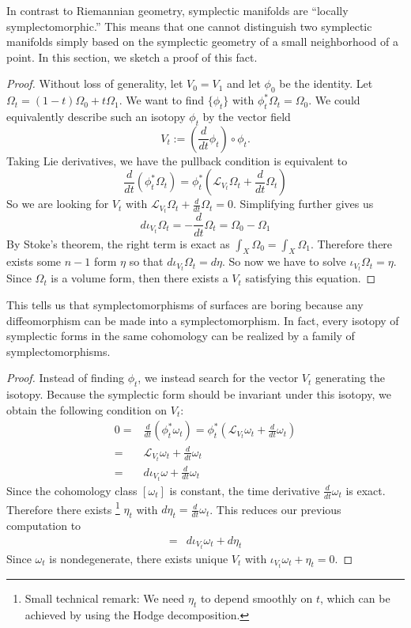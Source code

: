 
In contrast to Riemannian geometry,  symplectic manifolds are ``locally symplectomorphic.''
This means that one cannot distinguish two symplectic manifolds simply based on the symplectic geometry of a small neighborhood of a point. 
In this section, we sketch a proof of this fact.


\begin{proof}
    Without loss of generality,  let $V_0=V_1$ and let $\phi_0$ be the identity. 
    Let $\Omega_t=(1-t)\Omega_0+t\Omega_1$. 
    We want to find $\{\phi_t\}$ with $\phi_t^*\Omega_t=\Omega_0$. 
    We could equivalently describe such an isotopy $\phi_t$ by the vector field
    \[V_t:=\left(\frac{d}{dt}\phi_t\right)\circ\phi_t.\]
    Taking Lie derivatives,  we have the pullback condition is equivalent to  
    \[\frac{d}{dt}(\phi_t^*\Omega_t)=\phi_t^*\left(\mathcal L_{V_t} \Omega_t+\frac{d}{dt}\Omega_t\right)\]
    So we are looking for $V_t$ with $\mathcal L_{V_t}\Omega_t+\frac{d}{dt}\Omega_t=0$.
    Simplifying further gives us 
    \[
        d\iota_{V_t}\Omega_t=-\frac{d}{dt}\Omega_t=\Omega_0-\Omega_1\]
        By Stoke's theorem, the right term is exact as $\int_X\Omega_0=\int_X \Omega_1$. Therefore there exists some $n-1$ form $\eta$ so that
        $d\iota_{V_t}\Omega_t=d\eta$.
    So now we have to solve $\iota_{V_t}\Omega_t=\eta$. 
    Since $\Omega_t$ is a volume form,  then there exists a $V_t$ satisfying this equation. 
\end{proof}
This tells us that symplectomorphisms of surfaces are boring because any diffeomorphism can be made into a symplectomorphism. 
In fact, every isotopy of symplectic forms in the same cohomology can be realized by a family of symplectomorphisms. 

\begin{proof}
    Instead of finding $\phi_t$, we instead search for the vector $V_t$ generating the isotopy.
    Because the symplectic form should be invariant under this isotopy, we obtain the following condition on $V_t$:
    \begin{align*}  0=&\frac{d}{dt}(\phi_t^*\omega_t)=\phi_t^*\left(\mathcal L_{V_t}\omega_t+\frac{d}{dt}\omega_t\right)\\
        =&\mathcal L_{V_t}\omega_t + \frac{d}{dt}\omega_t\\
        =&d\iota_{V_t}\omega+\frac{d}{dt}\omega_t
    \end{align*}
    Since the cohomology class $[\omega_t]$ is constant,  the time derivative  $\frac{d}{dt}\omega_t$ is exact. Therefore there exists \footnote{Small technical remark: We need $\eta_t$ to depend smoothly on $t$, which can be achieved by using the Hodge decomposition.}  $\eta_t$ with $d\eta_t=\frac{d}{dt}\omega_t$.
        This reduces our previous computation to
    \begin{align*}
        =&d\iota_{V_t}\omega_t+d\eta_t
    \end{align*}
    Since $\omega_t$ is nondegenerate,  there exists unique $V_t$ with $\iota_{V_t}\omega_t+\eta_t=0$. 
\end{proof}

